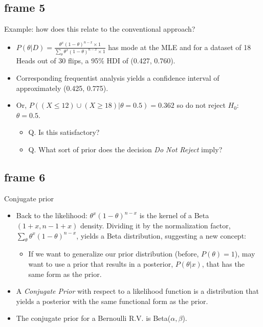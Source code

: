 \documentclass[xcolor=x11names,compress]{beamer}
\renewcommand{\(}{\begin{columns}}
\renewcommand{\)}{\end{columns}}
\newcommand{\<}[1]{\begin{column}{#1}}
\renewcommand{\>}{\end{column}}
\begin{document}
\subsection{frame 5}
\begin{frame}{Example: how does this relate to the conventional approach?}
\begin{itemize}
\item $P(\theta | D)=\frac{\theta^x(1-\theta)^{n-x} \times 1}{\sum_\theta \theta^x(1-\theta)^{n-x} \times 1}$ has mode at the MLE and for a dataset of 18 Heads out of 30 flips, a 95\% HDI of (0.427, 0.760).
\pause \item Corresponding frequentist analysis yields a confidence interval of approximately (0.425, 0.775).
\pause \item Or, $P((X \leq 12) \cup (X \geq 18) | \theta = 0.5)=0.362$ so do not reject $H_0:$ $\theta = 0.5$.
	\begin{itemize}
	\pause \item Q. Is this satisfactory?
	\pause \item Q. What sort of prior does the decision \textit{Do Not Reject} imply?
	\end{itemize}
\end{itemize}

\end{frame}


\subsection{frame 6}
\begin{frame}{Conjugate prior}
\begin{itemize}
\item Back to the likelihood: $\theta^x(1-\theta)^{n-x}$ is the kernel of a Beta$(1+x, n-1+x)$ density. Dividing it by the normalization factor, $\sum_\theta \theta^x(1-\theta)^{n-x}$, yields a Beta distribution, suggesting a new concept:
	\begin{itemize}
	\pause \item If we want to generalize our prior distribution (before, $P(\theta)=1$), may want to use a prior that results in a posterior, $P(\theta | x)$, that has the same form as the prior. 
	\end{itemize}
\pause \item A \textit{Conjugate Prior} with respect to a likelihood function is a distribution that yields a posterior with the same functional form as the prior.
\pause \item The conjugate prior for a Bernoulli R.V. is Beta($\alpha, \beta$).
\end{itemize}
\end{frame}
\end{document}
